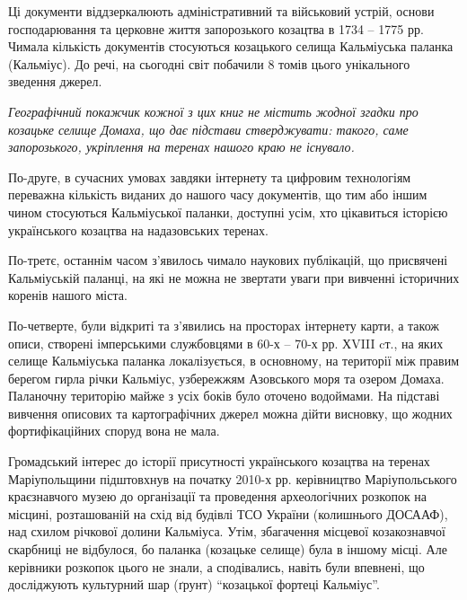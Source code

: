 
Ці документи віддзеркалюють адміністративний та військовий устрій, основи
господарювання та церковне життя запорозького козацтва в 1734 – 1775 рр. Чимала
кількість документів стосуються козацького селища Кальміуська паланка
(Кальміус). До речі, на сьогодні світ побачили 8 томів цього унікального
зведення джерел.


\begin{leftbar}
	\begingroup
	\em
Географічний покажчик кожної з цих книг не містить жодної згадки про
козацьке селище Домаха, що дає підстави стверджувати: такого, саме
запорозького, укріплення на теренах нашого краю не існувало.
	\endgroup
\end{leftbar}

По-друге, в сучасних умовах завдяки інтернету та цифровим технологіям переважна
кількість виданих до нашого часу документів, що тим або іншим чином стосуються
Кальміуської паланки, доступні усім, хто цікавиться історією українського
козацтва на надазовських теренах.

По-третє, останнім часом з'явилось чимало наукових публікацій, що присвячені
Кальміуській паланці, на які не можна не звертати уваги при вивченні історичних
коренів нашого міста.

По-четверте, були відкриті та з'явились на просторах інтернету карти, а також
описи, створені імперськими службовцями в 60-х – 70-х рр. ХVIII cт., на яких
селище Кальміуська паланка локалізується, в основному, на території між правим
берегом гирла річки Кальміус, узбережжям Азовського моря та озером Домаха.
Паланочну територію майже з усіх боків було оточено водоймами. На підставі
вивчення описових та картографічних джерел можна дійти висновку, що жодних
фортифікаційних споруд вона не мала.


Громадський інтерес до історії присутності українського козацтва на теренах
Маріупольщини підштовхнув на початку 2010-х рр. керівництво Маріупольського
краєзнавчого музею до організації та проведення археологічних розкопок на
місцині, розташованій на схід від будівлі ТСО України (колишнього ДОСААФ), над
схилом річкової долини Кальміуса. Утім, збагачення місцевої козакознавчої
скарбниці не відбулося, бо паланка (козацьке селище) була в іншому місці. Але
керівники розкопок цього не знали, а сподівались, навіть були впевнені, що
досліджують культурний шар (ґрунт) \enquote{козацької фортеці Кальміус}.

